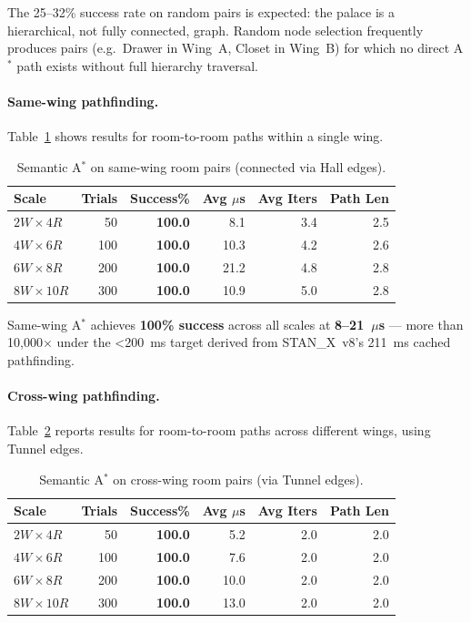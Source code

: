 \documentclass[11pt,a4paper]{article}
\begin{document}
The 25--32\% success rate on random pairs is expected: the palace is a
hierarchical, not fully connected, graph.  Random node selection frequently
produces pairs (e.g.\ Drawer in Wing~A, Closet in Wing~B) for which no
direct A$^*$ path exists without full hierarchy traversal.

\paragraph{Same-wing pathfinding.}
Table~\ref{tab:astar_samewing} shows results for room-to-room paths within a
single wing.

\begin{table}[ht]
\centering
\caption{Semantic A$^*$ on same-wing room pairs (connected via Hall edges).}
\label{tab:astar_samewing}
\begin{tabular}{lrrrrr}
\toprule
\textbf{Scale} & \textbf{Trials} & \textbf{Success\%} & \textbf{Avg $\mu$s} & \textbf{Avg Iters} & \textbf{Path Len} \\
\midrule
$2W \times 4R$ &  50 & \textbf{100.0} &  8.1 & 3.4 & 2.5 \\
$4W \times 6R$ & 100 & \textbf{100.0} & 10.3 & 4.2 & 2.6 \\
$6W \times 8R$ & 200 & \textbf{100.0} & 21.2 & 4.8 & 2.8 \\
$8W \times 10R$ & 300 & \textbf{100.0} & 10.9 & 5.0 & 2.8 \\
\bottomrule
\end{tabular}
\end{table}

Same-wing A$^*$ achieves \textbf{100\% success} across all scales at
\textbf{8--21~$\mu$s} --- more than 10,000$\times$ under the \textless200~ms
target derived from STAN\_X~v8's 211~ms cached pathfinding.

\paragraph{Cross-wing pathfinding.}
Table~\ref{tab:astar_crosswing} reports results for room-to-room paths across
different wings, using Tunnel edges.

\begin{table}[ht]
\centering
\caption{Semantic A$^*$ on cross-wing room pairs (via Tunnel edges).}
\label{tab:astar_crosswing}
\begin{tabular}{lrrrrr}
\toprule
\textbf{Scale} & \textbf{Trials} & \textbf{Success\%} & \textbf{Avg $\mu$s} & \textbf{Avg Iters} & \textbf{Path Len} \\
\midrule
$2W \times 4R$ &  50 & \textbf{100.0} &  5.2 & 2.0 & 2.0 \\
$4W \times 6R$ & 100 & \textbf{100.0} &  7.6 & 2.0 & 2.0 \\
$6W \times 8R$ & 200 & \textbf{100.0} & 10.0 & 2.0 & 2.0 \\
$8W \times 10R$ & 300 & \textbf{100.0} & 13.0 & 2.0 & 2.0 \\
\bottomrule
\end{tabular}
\end{table}
\end{document}

